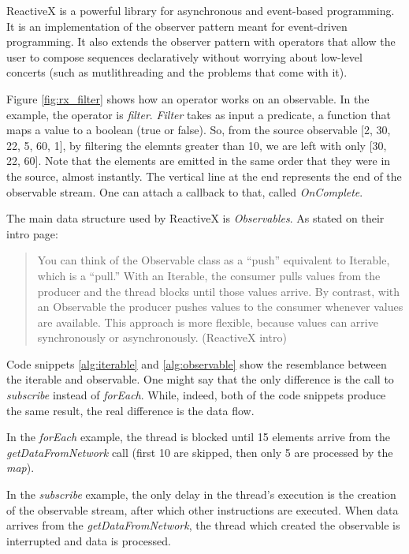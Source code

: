 \documentclass[12pt,a4paper,twoside]{report}
\begin{document}
  
ReactiveX is a powerful library for asynchronous and event-based programming. It is an implementation of the observer pattern meant for event-driven programming. It also extends the observer pattern with operators that allow the user to compose sequences declaratively without worrying about low-level concerts (such as mutlithreading and the problems that come with it).

Figure \ref{fig:rx_filter} shows how an operator works on an observable. In the example, the operator is \textit{filter}. \textit{Filter} takes as input a predicate, a function that maps a value to a boolean (true or false). So, from the source observable [2, 30, 22, 5, 60, 1], by filtering the elemnts greater than 10, we are left with only [30, 22, 60]. Note that the elements are emitted in the same order that they were in the source, almost instantly. The vertical line at the end represents the end of the observable stream. One can attach a callback to that, called \textit{OnComplete}.

The main data structure used by ReactiveX is \textit{Observables}. As stated on their intro page:

\begin{quote}
  You can think of the Observable class as a “push” equivalent to Iterable, which is a “pull.” With an Iterable, the consumer pulls values from the producer and the thread blocks until those values arrive. By contrast, with an Observable the producer pushes values to the consumer whenever values are available. This approach is more flexible, because values can arrive synchronously or asynchronously. (ReactiveX intro)
\end{quote}

Code snippets \ref{alg:iterable} and \ref{alg:observable} show the resemblance between the iterable and observable. One might say that the only difference is the call to \textit{subscribe} instead of \textit{forEach}. While, indeed, both of the code snippets produce the same result, the real difference is the data flow.

In the \textit{forEach} example, the thread is blocked until 15 elements arrive from the \textit{getDataFromNetwork} call (first 10 are skipped, then only 5 are processed by the \textit{map}).

In the \textit{subscribe} example, the only delay in the thread's execution is the creation of the observable stream, after which other instructions are executed. When data arrives from the \textit{getDataFromNetwork}, the thread which created the observable is interrupted and data is processed.
\end{document}
